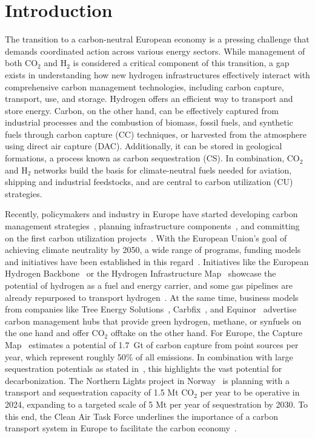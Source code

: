 \documentclass[twocolumn]{article}
\newcommand{\carbon}{CO$_2$}
\newcommand{\hydrogen}{H$_2$}
\begin{document}
\section{Introduction}

The transition to a carbon-neutral European economy is a pressing challenge that demands coordinated action across various energy sectors. While management of both \carbon{} and \hydrogen{} is considered a critical component of this transition, a gap exists in understanding how new hydrogen infrastructures effectively interact with comprehensive carbon management technologies, including carbon capture, transport, use, and storage. Hydrogen offers an efficient way to transport and store energy. Carbon, on the other hand, can be effectively captured from industrial processes and the combustion of biomass, fossil fuels, and synthetic fuels through carbon capture (CC) techniques, or harvested from the atmosphere using direct air capture (DAC). Additionally, it can be stored in geological formations, a process known as carbon sequestration (CS). In combination, \carbon{} and \hydrogen{} networks build the basis for climate-neutral fuels needed for aviation, shipping and industrial feedstocks, and are central to carbon utilization (CU) strategies.

Recently, policymakers and industry in Europe have started developing carbon management strategies~\cite{GermanyDevelopingStrategy2023,CarbonManagementStrategie}, planning infrastructure components~\cite{CONetz}, and committing on the first carbon utilization projects~\cite{EFuelsPilotPlant2022,OrstedAssumesFull,GROUNDBREAKINGEFUELPRODUCTION,DLREfuelsDLR}. With the European Union's goal of achieving climate neutrality by 2050, a wide range of programs, funding models and initiatives have been established in this regard~\cite{eu2023netzero,europeangreendeal,europeaninnovationfund}. Initiatives like the European Hydrogen Backbone~\cite{gasforclimateEuropeanHydrogenBackbone2022} or the Hydrogen Infrastructure Map~\cite{H2InfrastructureMap} showcase the potential of hydrogen as a fuel and energy carrier, and some gas pipelines are already repurposed to transport hydrogen~\cite{RohrFreiFuer}. At the same time, business models from companies like Tree Energy Solutions~\cite{TESHydrogenLife2023}, Carbfix~\cite{WeTurnCO2}, and Equinor~\cite{adomaitisEquinorRWEBuild2023} advertise carbon management hubs that provide green hydrogen, methane, or synfuels on the one hand and offer \carbon{} offtake on the other hand. For Europe, the Capture Map~\cite{ToolsGreenTransition} estimates a potential of 1.7~Gt of carbon capture from point sources per year, which represent roughly 50\% of all emissions. In combination with large sequestration potentials as stated in~\cite{weiProposedGlobalLayout2021}, this highlights the vast potential for decarbonization. The Northern Lights project in Norway~\cite{NorthernLightsWhat} is planning with a transport and sequestration capacity of 1.5 Mt \carbon{} per year  to be operative in 2024, expanding to a targeted scale of 5 Mt per year of sequestration by 2030.
To this end, the Clean Air Task Force underlines the importance of a carbon transport system in Europe to facilitate the carbon economy~\cite{lockwoodEuropeanStrategyCarbon}.
\end{document}
